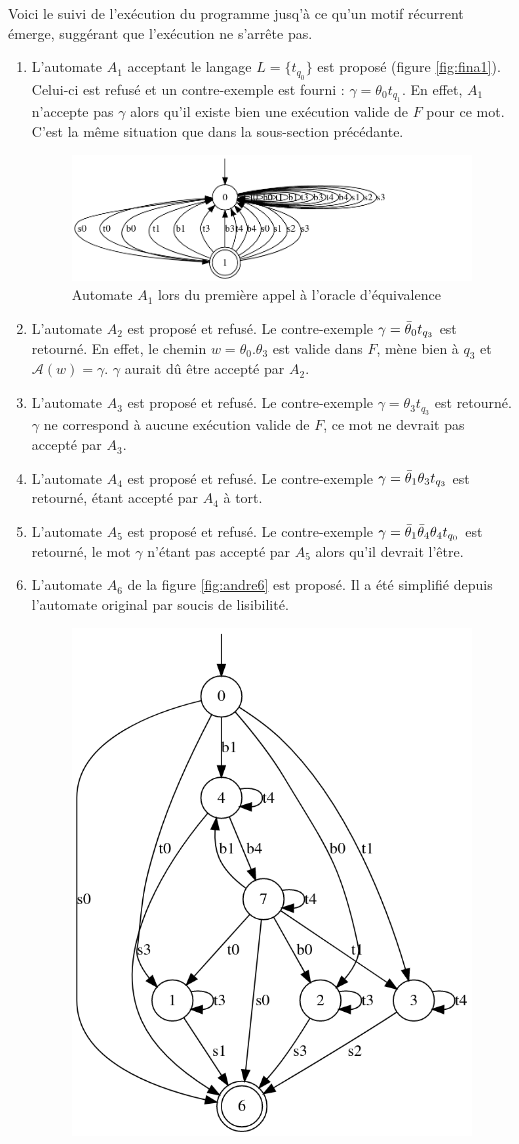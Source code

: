 Voici le suivi de l'exécution du programme jusq'à ce qu'un motif récurrent émerge, suggérant que l'exécution ne s'arrête pas.

\begin{enumerate}
  \item L'automate $A_1$ acceptant le langage $L=\{t_{q_0}\}$ est proposé (figure \ref{fig:fina1}). Celui-ci est refusé et un contre-exemple est fourni : $\gamma=\theta_0 t_{q_1}$. En effet, $A_1$ n'accepte pas $\gamma$ alors qu'il existe bien une exécution valide de $F$ pour ce mot. C'est la même situation que dans la sous-section précédante.
  \begin{figure}[H]
    \centering
    \includegraphics[width=0.6\linewidth]{res/andre_0}
    \caption{Automate $A_1$ lors du première appel à l'oracle d'équivalence}\label{fig:andre0}
  \end{figure}
  \item L'automate $A_2$ est proposé et refusé. Le contre-exemple $\gamma=\bar{\theta}_0 t_{q_3}$ est retourné. En effet, le chemin $w=\theta_0.\theta_3$ est valide dans $F$, mène bien à $q_3$ et $\mathcal{A}(w)=\gamma$. $\gamma$ aurait dû être accepté par $A_2$.
  \item L'automate $A_3$ est proposé et refusé. Le contre-exemple $\gamma=\theta_3 t_{q_3}$ est retourné. $\gamma$ ne correspond à aucune exécution valide de $F$, ce mot ne devrait pas accepté par $A_3$.
  \item L'automate $A_4$ est proposé et refusé. Le contre-exemple $\gamma=\bar{\theta}_1\theta_3 t_{q_3}$ est retourné, étant accepté par $A_4$ à tort.
  \item L'automate $A_5$ est proposé et refusé. Le contre-exemple $\gamma=\bar{\theta}_1\bar{\theta}_4\theta_4 t_{q_0}$ est retourné, le mot $\gamma$ n'étant pas accepté par $A_5$ alors qu'il devrait l'être.
  \item L'automate $A_6$ de la figure \ref{fig:andre6} est proposé. Il a été simplifié depuis l'automate original par soucis de lisibilité.
  \begin{figure}[H]
    \centering
    \includegraphics[width=0.4\linewidth]{res/andre_6}

\end{figure}
\end{enumerate}

